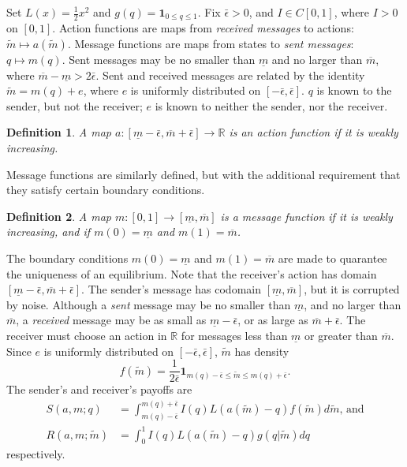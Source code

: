 \documentclass[12pt]{article}
\newtheorem{definition}{Definition}
\begin{document}
\noindent Set $L(x)=\tfrac{1}{2}x^2$ and $g(q)=\mathbf{1}_{0\leq q\leq1}$. Fix $\bar{\epsilon}>0$, and $I\in C[0,1]$, where $I>0$ on $[0,1]$. Action functions are maps from \textit{received messages} to actions: $\tilde{m}\mapsto a(\tilde{m})$. Message functions are maps from states to \textit{sent messages}: $q\mapsto m(q)$. Sent messages may be no smaller than $\underline{m}$ and no larger than $\overline{m}$, where $\overline{m}-\underline{m}>2\bar{\epsilon}$. Sent and received messages are related by the identity $\tilde{m}=m(q)+e$, where $e$ is uniformly distributed on $[-\bar{\epsilon},\bar{\epsilon}]$. $q$ is known to the sender, but not the receiver; $e$ is known to neither the sender, nor the receiver. 

\begin{definition}
A map $a:[\underline{m}-\bar{\epsilon},\overline{m}+\bar{\epsilon}]\rightarrow\mathbb{R}$ is an action function if it is weakly increasing.  
\end{definition}

\noindent Message functions are similarly defined, but with the additional requirement that they satisfy certain boundary conditions.
\begin{definition}
A map $m:[0,1]\rightarrow[\underline{m},\overline{m}]$ is a message function if it is weakly increasing, and if $m(0)=\underline{m}$ and $m(1)=\overline{m}$. 
\end{definition}
\noindent The boundary conditions $m(0)=\underline{m}$ and $m(1)=\overline{m}$ are made to quarantee the uniqueness of an equilibrium. Note that the receiver's action has domain $[\underline{m}-\bar{\epsilon},\overline{m}+\bar{\epsilon}]$. The sender's message has codomain $[\underline{m},\overline{m}]$, but it is corrupted by noise. Although a \textit{sent} message may be no smaller than $\underline{m}$, and no larger than $\overline{m}$, a \textit{received} message may be as small as $\underline{m}-\bar{\epsilon}$, or as large as $\overline{m}+\bar{\epsilon}$. The receiver must choose an action in $\mathbb{R}$ for messages less than $\underline{m}$ or greater than $\overline{m}$. Since $e$ is uniformly distributed on $[-\bar{\epsilon},\bar{\epsilon}]$, $\tilde{m}$ has density 
\begin{equation}
f(\tilde{m})=\frac{1}{2\bar{\epsilon}}\mathbf{1}_{m(q)-\bar{\epsilon}\leq\tilde{m}\leq m(q)+\bar{\epsilon}}.
\end{equation}
The sender's and receiver's payoffs are 
\begin{align}
S(a,m;q)&=\int_{m(q)-\bar{\epsilon}}^{m(q)+\bar{\epsilon}}{I(q)L(a(\tilde{m})-q)f(\tilde{m})d\tilde{m}}\text{, and}\\
R(a,m;\tilde{m})&=\int_{0}^{1}{I(q)L(a(\tilde{m})-q)g(q|\tilde{m})dq}
\end{align}
respectively. 
\end{document}

